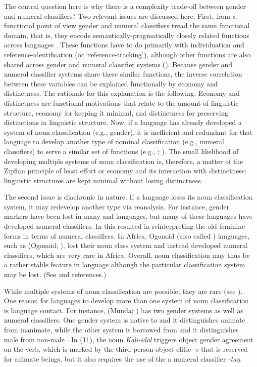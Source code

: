 \documentclass[output=collectionpaper]{langsci/langscibook}
\begin{document}
The central question here is why there is a complexity trade-off between gender and numeral classifiers? Two relevant issues are discussed here. First, from a functional point of view gender and numeral classifiers tread the same functional domain, that is, they encode semantically-pragmatically closely related functions across languages \citep[293]{Miestamo2007}. These functions have to do primarily with individuation and reference-identification (or `reference-tracking'), although other functions are also shared across gender and numeral classifier systems (\citealt[293--294]{Contini-Morava2013}). Because gender and numeral classifier systems share these similar functions, the inverse correlation between these variables can be explained functionally by economy and distinctness. The rationale for this explanation is the following. Economy and distinctness are functional motivations that relate to the amount of linguistic structure, economy for keeping it minimal, and distinctness for preserving distinctions in linguistic structure. Now, if a language has already developed a system of noun classification (e.g., gender), it is inefficient and redundant for that language to develop another type of nominal classification (e.g., numeral classifiers) to serve a similar set of functions (e.g., \citealt{Hawkins2004}; \citealt{Sinnemaeki2014}). The small likelihood of developing multiple systems of noun classification is, therefore, a matter of the Zipfian principle of least effort or economy and its interaction with distinctness: linguistic structures are kept minimal without losing distinctness.

The second issue is diachronic in nature. If a language loses its noun classification system, it may redevelop another type via reanalysis. For instance, gender markers have been lost in many  and  languages, but many of these languages have developed numeral classifiers. In  this resulted in reinterpreting the old feminine forms in terms of numeral classifiers. In Africa, Ogonoid (also called ) languages, such as  (Ogonoid; ), lost their noun class system and instead developed numeral classifiers, which are very rare in Africa. Overall, noun classification may thus be a rather stable feature in language although the particular classification system may be lost. (See \citealt[379--381]{Aikhenvald2000} and references.)

While multiple systems of noun classification are possible, they are rare (see ). One reason for languages to develop more than one system of noun classification is language contact. For instance,  (Munda; ) has two gender systems as well as numeral classifiers. One gender system is native to  and it distinguishes animate from inanimate, while the other system is borrowed from  and it distinguishes male from non-male \citep[39]{Ghosh2008}. In (11), the noun \textit{Kali-idol} triggers object gender agreement on the verb, which is marked by the third person object clitic -\textit{e} that is reserved for animate beings, but it also requires the use of the a numeral classifier -\textit{taŋ}.
\end{document}
